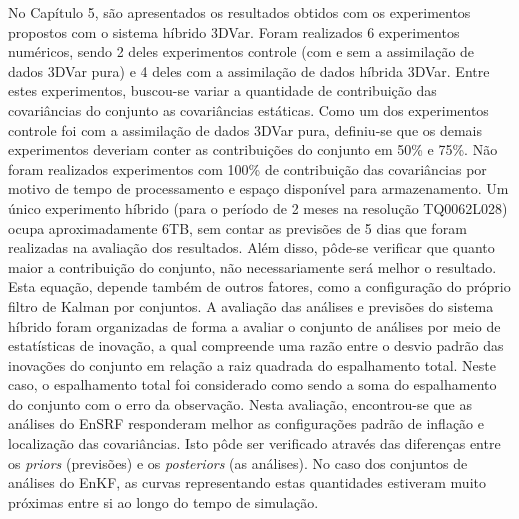 No Capítulo 5, são apresentados os resultados obtidos com os experimentos propostos com o sistema híbrido 3DVar. Foram realizados 6 experimentos numéricos, sendo 2 deles experimentos controle (com e sem a assimilação de dados 3DVar pura) e 4 deles com a assimilação de dados híbrida 3DVar. Entre estes experimentos, buscou-se variar a quantidade de contribuição das covariâncias do conjunto as covariâncias estáticas. Como um dos experimentos controle foi com a assimilação de dados 3DVar pura, definiu-se que os demais experimentos deveriam conter as contribuições do conjunto em 50\% e 75\%. Não foram realizados experimentos com 100\% de contribuição das covariâncias por motivo de tempo de processamento e espaço disponível para armazenamento. Um único experimento híbrido (para o período de 2 meses na resolução TQ0062L028) ocupa aproximadamente 6TB, sem contar as previsões de 5 dias que foram realizadas na avaliação dos resultados. Além disso, pôde-se verificar que quanto maior a contribuição do conjunto, não necessariamente será melhor o resultado. Esta equação, depende também de outros fatores, como a configuração do próprio filtro de Kalman por conjuntos. A avaliação das análises e previsões do sistema híbrido foram organizadas de forma a avaliar o conjunto de análises por meio de estatísticas de inovação, a qual compreende uma razão entre o desvio padrão das inovações do conjunto em relação a raiz quadrada do espalhamento total. Neste caso, o espalhamento total foi considerado como sendo a soma do espalhamento do conjunto com o erro da observação. Nesta avaliação, encontrou-se que as análises do EnSRF responderam melhor as configurações padrão de inflação e localização das covariâncias. Isto pôde ser verificado através das diferenças entre os \textit{priors} (previsões) e os \textit{posteriors} (as análises). No caso dos conjuntos de análises do EnKF, as curvas representando estas quantidades estiveram muito próximas entre si ao longo do tempo de simulação.

